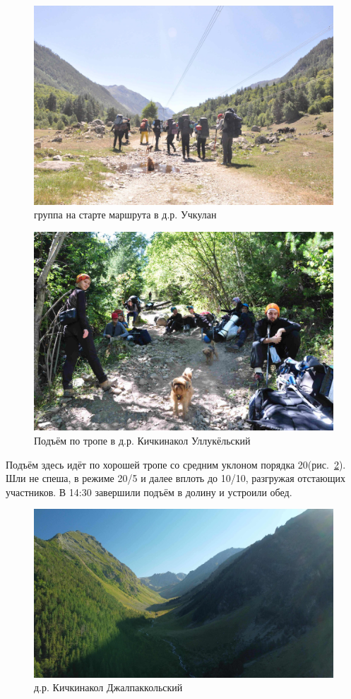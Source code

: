 \begin{figure}[h!]
	\centering
	\includegraphics[width=0.7\linewidth]{../pics/DSC_0412}
	\caption{группа на старте маршрута в д.р. Учкулан}
	\label{fig:uchkulan}
\end{figure}

\begin{figure}[h!]
	\centering
	\includegraphics[width=0.7\linewidth]{../pics/DSC_0436}
	\caption{Подъём по тропе в д.р. Кичкинакол Уллукёльский}
	\label{fig:DSC_0436}
\end{figure}

Подъём здесь идёт по хорошей тропе со средним уклоном порядка 20\degree (рис.~\ref{fig:DSC_0436}). Шли не спеша, в режиме 20/5 и далее вплоть до 10/10, разгружая отстающих участников. В 14:30 завершили подъём в долину и устроили обед.

\begin{figure}[h!]
	\centering
	\includegraphics[width=0.7\linewidth]{../pics/DJI_0805}
	\caption{д.р. Кичкинакол Джалпаккольский}
	\label{fig:kichkinakol}
\end{figure}

